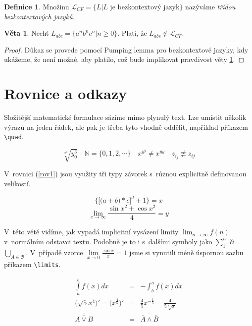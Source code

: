 \documentclass[11pt,a4paper,twocolumn]{article}
\theoremstyle{definition}
\newtheorem{defn}{Definice}[section]
\theoremstyle{lemma}
\newtheorem{sntc}{Věta}
\begin{document}
\begin{defn} 
  \label{defn4}
  Množinu $\mathcal{L}_{CF}=\{L|L$ je bezkontextový jazyk$\}$ nazýváme {\itshape třídou bezkontextových jazyků.}
\end{defn}

\begin{sntc}
  \label{sntc1}
  Nechť $L_{abc}=\{a^nb^nc^n|n\geq 0\}$. Platí, že $L_{abs}\notin \mathcal{L}_{CF}$.
\end{sntc}

\begin{proof} 
  \label{proof}
  Důkaz se provede pomocí Pumping lemma pro bezkontextové jazyky, kdy ukážeme, že není možné, aby
  platilo, což bude implikovat pravdivost věty \ref{sntc1}.
\end{proof}

\section{Rovnice a odkazy}
\label{rovniceaodkazy}

\noindent Složitější matematické formulace sázíme mimo plynulý text. Lze umístit několik výrazů
na jeden řádek, ale pak je třeba tyto vhodně oddělit, například příkazem \verb|\quad|.

$$\sqrt[x^2]{y^3_0} \quad \mathbb{N} =\{0, 1, 2,\cdots\}\quad x^{y^y} \not =x^{yy} \quad z_{i_j}
\not\equiv z_{ij}$$

\indent V~rovnici (\ref{rov1}) jsou využity tři typy závorek s~různou explicitně definovanou velikostí.

\begin{equation}\label{rov1}
 \bigg\{\Big[\big(a+b\big)*c\Big]^d+1\bigg\}=x 
\end{equation}
$$\lim_{x\to \infty} \frac{\sin{x}^2+\cos{x}^2}{4} = y$$

\indent V~této větě vidíme, jak vypadá implicitní vysázení limity $\lim_{n\to \infty}f(n)$
v~normálním odstavci textu. Podobně je to i s~dalšími symboly jako $\sum_1^n$ či
$\bigcup_{A\in \mathcal{B}}$. V~případě vzorce $\lim\limits _{x\to 0} \frac{\sin{x}}{x}\!=\!1$ jsme si vynutili méně úspornou
sazbu příkazem \verb|\limits|.

\begin{eqnarray}
  \int\limits_{a}^{b} f(x)dx & = & -\int_b^a f(x)dx \\
  \Big(\sqrt{5}{x^4}\Big)' = \Big(x^\frac{4}{5}\Big)' & = & \frac{4}{5}x^{-\frac{1}{5}} =
  \frac{4}{5\sqrt[5]{x}} \\
  \overline{\overline{A \lor B}} & = & \overline{\overline{A}\land\overline{B}}
\end{eqnarray}
\end{document}
